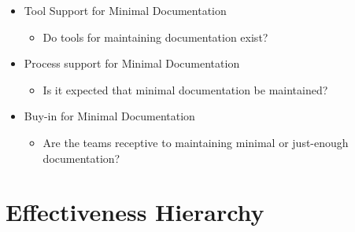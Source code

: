 \begin{appendices}
\begin{itemize}
		\begin{itemize}
			\item Tool Support for Minimal Documentation
				\begin{itemize}
					\item Do tools for maintaining documentation exist?
				\end{itemize}
			\item Process support for Minimal Documentation
				\begin{itemize}
					\item Is it expected that minimal documentation be maintained?
				\end{itemize}
			\item Buy-in for Minimal Documentation
				\begin{itemize}
					\item Are the teams receptive to maintaining minimal or just-enough documentation?
				\end{itemize}
		\end{itemize}
\end{itemize}






\section{Effectiveness Hierarchy} \label{sec:effectiveness_hierarchy}


\end{appendices}
